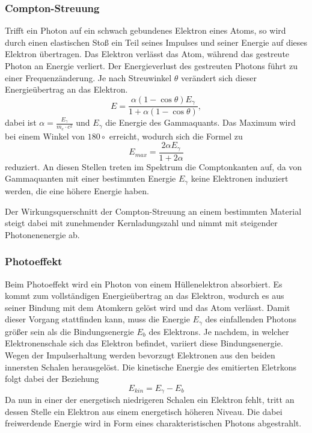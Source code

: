 \subsubsection{Compton-Streuung}
Trifft ein Photon auf ein schwach gebundenes Elektron eines Atoms, so wird durch einen elastischen Stoß ein Teil seines Impulses und seiner Energie auf dieses Elektron übertragen. Das Elektron verlässt das Atom, während das gestreute Photon an Energie verliert. Der Energieverlust des gestreuten Photons führt zu einer Frequenzänderung. Je nach Streuwinkel $\theta$ verändert sich dieser Energieübertrag an das Elektron.
\begin{equation}
 E=\frac{\alpha(1-\cos \theta)E_\gamma}{1+\alpha(1-\cos\theta)},
\end{equation}
dabei ist $\alpha=\frac{E_\gamma}{m_e\cdot c^2}$ und $E_\gamma$ die Energie des Gammaquants. Das Maximum wird bei einem Winkel von $180\circ $ erreicht, wodurch sich die Formel zu
\begin{equation}
 E_{max}=\frac{2\alpha E_\gamma}{1+2\alpha}
\end{equation}
reduziert. An diesen Stellen treten im Spektrum die Comptonkanten auf, da von Gammaquanten mit einer bestimmten Energie $E_\gamma$ keine Elektronen induziert werden, die eine höhere Energie haben.


Der Wirkungsquerschnitt der Compton-Streuung an einem bestimmten Material steigt dabei mit zunehmender Kernladungszahl und nimmt mit steigender Photonenenergie ab. 
\subsubsection{Photoeffekt}
Beim Photoeffekt wird ein Photon von einem Hüllenelektron absorbiert. Es kommt zum vollständigen Energieübertrag an das Elektron, wodurch es aus seiner Bindung mit dem Atomkern gelöst wird und das Atom verlässt. Damit dieser Vorgang stattfinden kann, muss die Energie $E_\gamma$ des einfallenden Photons größer sein als die Bindungsenergie $E_b$ des Elektrons. Je nachdem, in welcher Elektronenschale sich das Elektron befindet, variiert diese Bindungsenergie. Wegen der Impulserhaltung werden bevorzugt Elektronen aus den beiden innersten Schalen herausgelöst. Die kinetische Energie des emitierten Eletrkons folgt dabei der Beziehung
\begin{equation}
E_{kin}=E_\gamma - E_b
\end{equation}
Da nun in einer der energetisch niedrigeren Schalen ein Elektron fehlt, tritt an dessen Stelle ein Elektron aus einem energetisch höheren Niveau. Die dabei freiwerdende Energie wird in Form eines charakteristischen Photons abgestrahlt.

